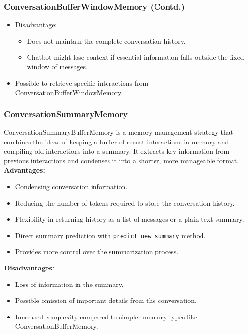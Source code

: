 \begin{frame}[fragile]
\frametitle{ConversationBufferWindowMemory (Contd.)}

\begin{itemize}
    \item Disadvantage:
    \begin{itemize}
        \item Does not maintain the complete conversation history.
        \item Chatbot might lose context if essential information falls outside the fixed window of messages.
    \end{itemize}
    \item Possible to retrieve specific interactions from ConversationBufferWindowMemory.
\end{itemize}

\end{frame}

\begin{frame}[fragile]
\frametitle{ConversationSummaryMemory}
ConversationSummaryBufferMemory is a memory management strategy that combines the ideas of keeping a buffer of recent interactions in memory and compiling old interactions into a summary. It extracts key information from previous interactions and condenses it into a shorter, more manageable format. 
\textbf{Advantages:}
\begin{itemize}
    \item Condensing conversation information.
    \item Reducing the number of tokens required to store the conversation history.
    \item Flexibility in returning history as a list of messages or a plain text summary.
    \item Direct summary prediction with \texttt{predict\_new\_summary} method.
    \item Provides more control over the summarization process.
\end{itemize}

\textbf{Disadvantages:}
\begin{itemize}
    \item Loss of information in the summary.
    \item Possible omission of important details from the conversation.
    \item Increased complexity compared to simpler memory types like ConversationBufferMemory.
\end{itemize}

\end{frame}


